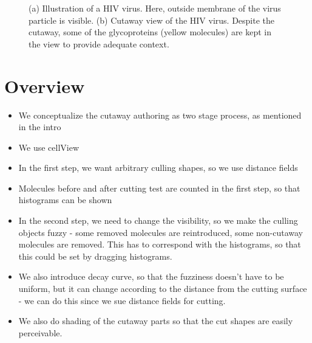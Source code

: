 \begin{comment}
We focus on real-time visualization tools that can be used for illustration of molecular data.
In these scenarios, the user does not have direct control over the presented content, in contrast to a scenario where the content is created by manually placing individual molecules into the scene.
Therefore, Visibility Equalizer provides essential information about the scene while multiple culling objects are placed and dynamically manipulated.

\end{comment}

\begin{figure}[t]
 \centering
 \caption{\label{fig:hiv}(a) Illustration of a HIV virus. Here, outside membrane of the virus particle is visible. (b) Cutaway view of the HIV virus. Despite the cutaway, some of the glycoproteins (yellow molecules) are kept in the view to provide adequate context.}
\end{figure}




\section{Overview}

\begin{itemize}
	\item We conceptualize the cutaway authoring as two stage process, as mentioned in the intro		\item We use cellView
	\item In the first step, we want arbitrary culling shapes, so we use distance fields
	\item Molecules before and after cutting test are counted in the first step, so that histograms can be shown
	\item In the second step, we need to change the visibility, so we make the culling objects fuzzy - some removed molecules are reintroduced, some non-cutaway molecules are removed. This has to correspond with the histograms, so that this could be set by dragging histograms.
	\item We also introduce decay curve, so that the fuzziness doesn't have to be uniform, but it can change according to the distance from the cutting surface - we can do this since we sue distance fields for cutting.
	\item We also do shading of the cutaway parts so that the cut shapes are easily perceivable.
\end{itemize}


